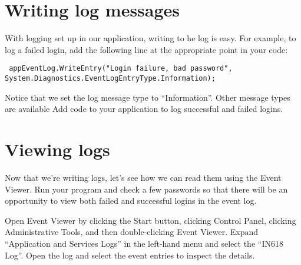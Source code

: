 \documentclass{article}
\begin{document}
\section{Writing log messages}
With logging set up in our application, writing to he log is easy.  For example, to log a failed login,
add the following line at the appropriate point in your code:

\texttt{ appEventLog.WriteEntry("Login failure, bad password", System.Diagnostics.EventLogEntryType.Information); }

Notice that we set the log message type to ``Information''.  Other message types are available
Add code to your application to log successful and failed logins.
\section{Viewing logs}
Now that we're writing logs, let's see how we can read them using the Event Viewer. Run your program and check a few passwords so that there will be an opportunity to view both failed and successful logins in the event log.

Open Event Viewer by clicking the Start button, clicking Control Panel, clicking Administrative Tools, and then double-clicking Event Viewer. Expand ``Application and Services Logs'' in the left-hand menu and select the ``IN618 Log''.  Open the log and select the event entries to inspect the details.
\end{document}
